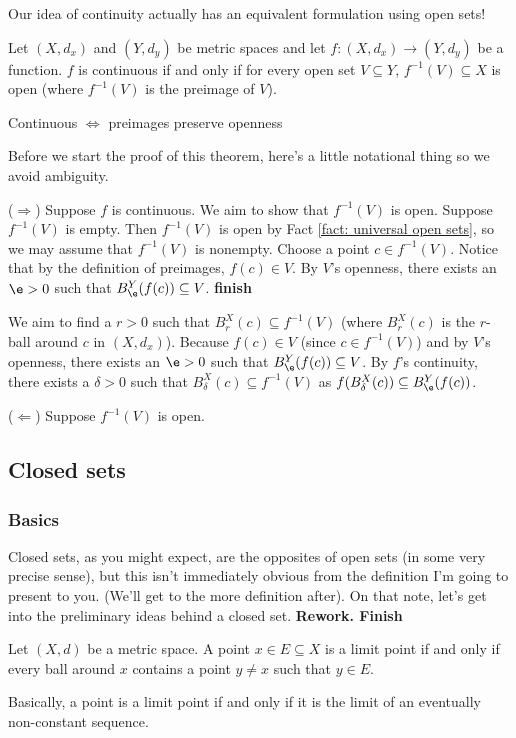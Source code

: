 \documentclass[class=article, crop=false]{standalone}
\begin{document}
Our idea of continuity actually has an equivalent formulation using open sets!
\begin{thm}
    Let $(X,d_x)$ and $(Y,d_y)$ be metric spaces and let $f \colon (X,d_x) \to (Y,d_y)$ be a function. $f$ is continuous if and only if for every open set $V \subseteq Y$, $f^{-1}(V) \subseteq X$ is open (where $f^{-1}(V)$ is the preimage of $V$).
\end{thm}
\begin{slogan}
    Continuous $\iff$ preimages preserve openness
\end{slogan}
Before we start the proof of this theorem, here's a little notational thing so we avoid ambiguity.
\begin{pf}
    ($\Rightarrow$) Suppose $f$ is continuous. We aim to show that $f^{-1}(V)$ is open. Suppose $f^{-1}(V)$ is empty. Then $f^{-1}(V)$ is open by Fact \ref{fact: universal open sets}, so we may assume that $f^{-1}(V)$ is nonempty. Choose a point $c \in f^{-1}(V)$. Notice that by the definition of preimages, $f(c) \in V$. By $V$'s openness, there exists an $\e > 0$
    such that $B_\e^Y(f(c)) \subseteq V$. \textbf{finish}



    We aim to find a $r > 0$ such that
    $B_r^X(c) \subseteq f^{-1}(V)$ (where $B_r^X(c)$ is the $r$-ball around $c$ in $(X,d_x)$). Because $f(c) \in V$ (since $c \in f^{-1}(V)$) and by $V$'s openness, there exists an $\e > 0$ such that $B_\e^Y(f(c)) \subseteq V$. By $f$'s continuity, there exists a $\delta > 0$
    such that $B_\delta^X(c) \subseteq f^{-1}(V)$ as $f(B_\delta^X(c)) \subseteq B_\e^Y(f(c))$.

    ($\Leftarrow$) Suppose $f^{-1}(V)$ is open.
\end{pf}




\subsection{Closed sets}

\subsubsection*{Basics}

Closed sets, as you might expect, are the opposites of open sets (in some very precise sense), but this isn't immediately obvious from the definition I'm going to present to you. (We'll get to the more definition after). On that note, let's get into the preliminary ideas behind a closed set. \textbf{Rework. Finish}
\begin{defn}
    Let $(X,d)$ be a metric space. A point $x \in E \subseteq X$ is a limit point if and only if every ball around $x$ contains a point $y \neq x$ such that $y \in E$.
\end{defn}
Basically, a point is a limit point if and only if it is the limit of an eventually non-constant sequence.
\end{document}
